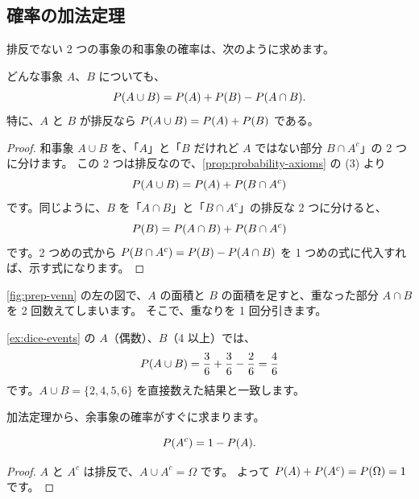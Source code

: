 \subsection{確率の加法定理}

排反でない 2 つの事象の和事象の確率は、次のように求めます。

\begin{theorem}
  どんな事象 $A$、$B$ についても、
  \[
    P(A \cup B) = P(A) + P(B) - P(A \cap B).
  \]
  特に、$A$ と $B$ が排反なら $P(A \cup B) = P(A) + P(B)$ である。
\end{theorem}

\begin{proof}
  和事象 $A \cup B$ を、「$A$」と「$B$ だけれど $A$ ではない部分 $B \cap A^c$」の 2 つに分けます。
  この 2 つは排反なので、\cref{prop:probability-axioms} の (3) より
  \[
    P(A \cup B) = P(A) + P(B \cap A^c)
  \]
  です。同じように、$B$ を「$A \cap B$」と「$B \cap A^c$」の排反な 2 つに分けると、
  \[
    P(B) = P(A \cap B) + P(B \cap A^c)
  \]
  です。2 つめの式から $P(B \cap A^c) = P(B) - P(A \cap B)$ を 1 つめの式に代入すれば、示す式になります。
\end{proof}

\begin{intuition}
  \cref{fig:prep-venn} の左の図で、$A$ の面積と $B$ の面積を足すと、重なった部分 $A \cap B$ を 2 回数えてしまいます。
  そこで、重なりを 1 回分引きます。
\end{intuition}

\begin{example}
  \cref{ex:dice-events} の $A$（偶数）、$B$（4 以上）では、
  \[
    P(A \cup B) = \frac{3}{6} + \frac{3}{6} - \frac{2}{6} = \frac{4}{6}
  \]
  です。$A \cup B = \{2, 4, 5, 6\}$ を直接数えた結果と一致します。
\end{example}

加法定理から、余事象の確率がすぐに求まります。

\begin{corollary}
  \[
    P(A^c) = 1 - P(A).
  \]
\end{corollary}

\begin{proof}
  $A$ と $A^c$ は排反で、$A \cup A^c = \Omega$ です。
  よって $P(A) + P(A^c) = P(\Omega) = 1$ です。
\end{proof}


